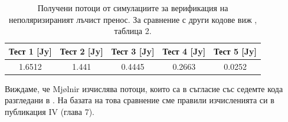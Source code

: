 \begin{appendices}
\begin{table}[h!]
	\centering
	\begin{tabular}{c|c|c|c|c}
		\hline
		{Тест 1 [Jy]} & {Тест 2 [Jy]} & {Тест 3 [Jy]} & {Тест 4 [Jy]} & {Тест 5 [Jy]}
		\\\hline\hline
		1.6512 & 1.441 & 0.4445 & 0.2663 & 0.0252
		\\\hline\hline
	\end{tabular}
	\caption[Получени потоци от симулациите за верификация на неполяризираният лъчист пренос.]{\small Получени потоци от симулациите за верификация на неполяризираният лъчист пренос. За сравнение с други кодове виж \cite{Gold2020}, таблица 2.}
	\label{table:Sim_Verification_flux}
\end{table}
Виждаме, че Mjølnir изчислява потоци, които са в съгласие със седемте кода разгледани в \cite{Gold2020}. На базата на това сравнение сме правили изчисленията си в публикация IV (глава 7).

\end{appendices}
